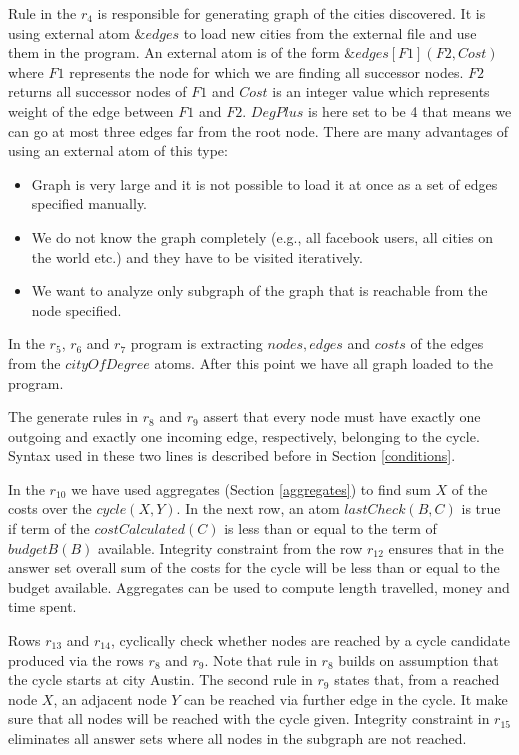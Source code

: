 \documentclass[14pt,a4paper, titlepage]{article}
\newcommand{\ext}[3]{\ensuremath{\&{#1}[#2](#3)}}
\begin{document}
Rule in the $r_4$ is responsible for generating graph of 
the cities discovered. It is using external atom 
$\mathit{\&edges}$ to load new cities from the external 
file and use them in the program. An external atom is of 
the form $\ext{edges}{F1}{F2,Cost}$ where $\mathit{F1}$ 
represents the node for which we are finding all successor 
nodes. $\mathit{F2}$ returns all successor nodes of 
$\mathit{F1}$ and $\mathit{Cost}$ is an integer value which 
represents weight of the edge between $\mathit{F1}$ and 
$\mathit{F2}$. $\mathit{DegPlus}$ is here set to be 4 that 
means we can go at most three edges far from the root node. 
There are many advantages of using an external atom of this
type:
\begin{itemize}
\item Graph is very large and it is not possible to load it 
at once as a set of edges specified manually.
\item We do not know the graph completely (e.g., all facebook users, all cities on the world etc.) and they have to be visited iteratively.
\item We want to analyze only subgraph of the graph that is reachable from the node specified.
\end{itemize}    
In the $r_5$, $r_6$ and $r_7$ program is extracting $\mathit{nodes}, \mathit{edges}$ and $\mathit{costs}$ of the edges from the $\mathit{cityOfDegree}$ atoms. After this point we have all graph loaded to the program. 

The generate rules in $r_8$ and $r_{9}$ assert that every 
node must have exactly one outgoing and exactly one 
incoming edge, respectively, belonging to the cycle. Syntax used in these two lines is described before in Section \ref{conditions}.

In the $r_{10}$ we have used aggregates (Section 
\ref{aggregates}) to find sum $X$ of the costs over the 
$\mathit{cycle(X,Y)}$. In the next row, an atom 
$\mathit{lastCheck(B,C)}$ is true if term of the 
$\mathit{costCalculated(C)}$ is less than or equal to the 
term of $\mathit{budgetB(B)}$ available. Integrity 
constraint from the row $r_{12}$ ensures that in the answer 
set overall sum of the costs for the cycle will be less 
than or equal to the budget available. Aggregates can be 
used to compute length travelled, money and time spent.

Rows $r_{13}$ and $r_{14}$, cyclically check whether nodes are reached by a cycle candidate produced via the rows $r_8$ and $r_9$.  Note that rule in $r_8$ builds on assumption that the cycle starts at city Austin. The second rule in $r_9$ states that, from a reached node $X$, an adjacent node $Y$ can be reached via further edge in the cycle. It make sure that all nodes will be reached with the cycle given. Integrity constraint in $r_{15}$ eliminates all answer sets where all nodes in the subgraph are not reached.
\end{document}
